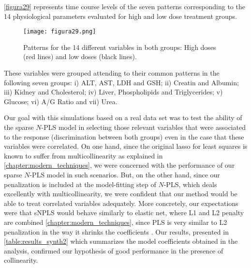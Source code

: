 \autoref{figura29} represents time course levels of the seven patterns corresponding to the 14 physiological parameters evaluated for high and low dose treatment groups. 

\begin{figure}[hbtp]
	\centering
\texttt{[image: figura29.png]}
\caption[Patterns for the 14 different variables in the data driven synthetic data set]{Patterns for the 14 different variables in both groups: High doses (red lines) and low doses (black lines).}
\label{figura29}
\end{figure}

These variables were grouped attending to their common patterns in the following seven groups: i) ALT, AST, LDH and GSH; ii) Creatin and Albumin; iii) Kidney and Cholesterol; iv) Liver, Phospholipids and Triglycerides; v) Glucose; vi) A/G Ratio and vii) Urea.

Our goal with this simulations based on a real data set was to test the ability of the sparse $N$-PLS model in selecting those relevant variables that were associated to the response (discrimination between both groups) even in the case that these variables were correlated. On one hand, since the original lasso for least squares is known to suffer from multicollinearity as explained in \autoref{chapter:modern_techniques}, we were concerned with the performance of our sparse $N$-PLS model in such scenarios. But, on the other hand, since our penalization is included at the model-fitting step of $N$-PLS, which deals excellently with multicollinearity, we were confident that our method would be able to treat correlated variables adequately. More concretely, our expectations were that sNPLS would behave similarly to elastic net, where L1 and L2 penalty are combined \autoref{chapter:modern_techniques}, since PLS is very similar to L2 penalization in the way it shrinks the coefficients \parencite{de1995pls}. Our results, presented in \autoref{table:results_synth2} which summarizes the model coefficients obtained in the analysis, confirmed our hypothesis of good performance in the presence of collinearity. 

